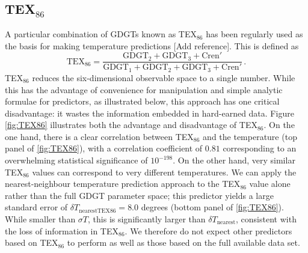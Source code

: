 \documentclass[rmp,aps,twocolumn]{revtex4-1}
\newcommand{\citeme}{{\color{blue} [Add reference]}}
\def\be{\begin{equation}}
\def\ee{\end{equation}}
\begin{document}
\subsection{TEX$_{86}$}

A particular combination of GDGTs known as TEX$_{86}$ has been regularly used as the basis for making temperature predictions \citeme.  This is defined as 
\be\label{eq:TEX86}
\mathrm{TEX}_{86} = \frac{\mathrm{GDGT}_2+\mathrm{GDGT}_3+\mathrm{Cren}'}{\mathrm{GDGT}_1+\mathrm{GDGT}_2+\mathrm{GDGT}_3+\mathrm{Cren}'}\, .
\ee
TEX$_{86}$ reduces the six-dimensional observable space to a single number.  While this has the advantage of convenience for manipulation and simple analytic formulae for predictors, as illustrated below, this approach has one critical disadvantage: it wastes the information embedded in hard-earned data.  Figure \ref{fig:TEX86} illustrates both the advantage and disadvantage of TEX$_{86}$.  On the one hand, there is a clear correlation between TEX$_{86}$ and the temperature (top panel of \autoref{fig:TEX86}), with a correlation coefficient of $0.81$ corresponding to an overwhelming statistical significance of $10^{-198}$.  On the other hand, very similar TEX$_{86}$ values can correspond to very different temperatures.  We can apply the nearest-neighbour temperature prediction approach to the TEX$_{86}$ value alone rather than the full GDGT parameter space; this predictor yields a large standard error of $\delta T_\mathrm{nearest TEX86} = 8.0$ degrees (bottom panel of \autoref{fig:TEX86}).  While smaller than $\sigma T$, this is significantly larger than $\delta T_\mathrm{nearest}$, consistent with the loss of information in TEX$_{86}$.  We therefore do not expect other predictors based on TEX$_{86}$ to perform as well as those based on the full available data set.
\end{document}
